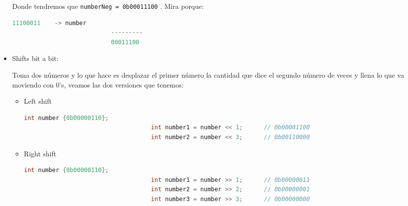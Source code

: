 \documentclass[12pt, fleqn]{report}                             %
\theoremstyle{break}                                            %
\newcommand{\textCode}[1]  { \texttt{#1} }                      %
\begin{document}
\begin{itemize}
                        Donde tendremos que \textCode{numberNeg = 0b00011100}. Mira porque:
                        \begin{lstlisting}[language=C++, gobble=28]
                            11100011    -> number
                            ---------
                            00011100
                        \end{lstlisting}
                    
                    \item Shifts bit a bit:
                    
                        Toma dos números y lo que hace es desplazar el primer número la cantidad que dice el 
                        segundo número de veces y llena lo que va moviendo con 0's, 
                        veamos las dos versiones que tenemos: 
                        \begin{itemize}
                            \item Left shift
                                \begin{lstlisting}[language=C++, gobble=36]
                                    int number {0b00000110};
                                    int number1 = number << 1;      // 0b00001100
                                    int number2 = number << 3;      // 0b00110000
                                \end{lstlisting}

                            \item Right shift
                                \begin{lstlisting}[language=C++, gobble=36]
                                    int number {0b00000110};
                                    int number1 = number >> 1;      // 0b00000011
                                    int number2 = number >> 2;      // 0b00000001
                                    int number3 = number >> 3;      // 0b00000000
                                \end{lstlisting}

                        \end{itemize}
                    
                \end{itemize}



        \clearpage
\end{document}
